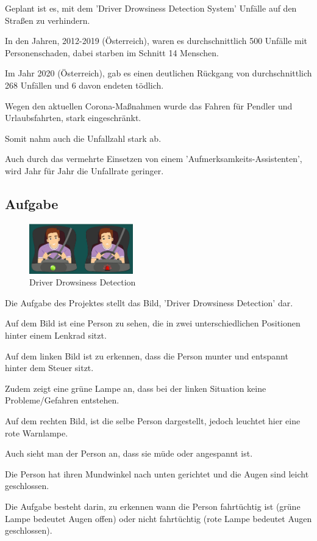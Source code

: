 Geplant ist es, mit dem 'Driver Drowsiness Detection System' Unfälle auf den Straßen zu verhindern.

In den Jahren, 2012-2019 (Österreich), waren es durchschnittlich 500 Unfälle mit Personenschaden, 
dabei starben im Schnitt 14 Menschen.

Im Jahr 2020 (Österreich), gab es einen deutlichen Rückgang von durchschnittlich 268 Unfällen und 6 davon endeten tödlich. 

Wegen den aktuellen Corona-Maßnahmen wurde das Fahren für Pendler und Urlaubsfahrten, stark eingeschränkt. 

Somit nahm auch die Unfallzahl stark ab.

Auch durch das vermehrte Einsetzen von einem 'Aufmerksamkeits-Assistenten', wird Jahr für Jahr die Unfallrate geringer.\cite{b6}

\subsection{Aufgabe}

\begin{figure}[htbp]
  \centering
     \includegraphics[width=0.40\textwidth]{Fahrer.png}
     \caption{Driver Drowsiness Detection}
\end{figure}

Die Aufgabe des Projektes stellt das Bild, 'Driver Drowsiness Detection' dar.

Auf dem Bild ist eine Person zu sehen, die in zwei unterschiedlichen Positionen hinter einem Lenkrad sitzt.

Auf dem linken Bild ist zu erkennen, dass die Person munter und entspannt hinter dem Steuer sitzt.

Zudem zeigt eine grüne Lampe an, dass bei der linken Situation keine Probleme/Gefahren entstehen.

Auf dem rechten Bild, ist die selbe Person dargestellt, jedoch leuchtet hier eine rote Warnlampe.

Auch sieht man der Person an, dass sie müde oder angespannt ist.

Die Person hat ihren Mundwinkel nach unten gerichtet und die Augen sind leicht geschlossen.

Die Aufgabe besteht darin, zu erkennen wann die Person fahrtüchtig ist (grüne Lampe bedeutet Augen offen) oder nicht fahrtüchtig (rote Lampe bedeutet Augen geschlossen).


